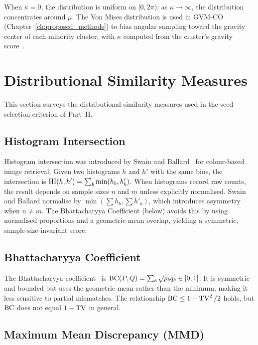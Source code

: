 When $\kappa = 0$, the distribution is uniform on $[0, 2\pi)$; as $\kappa \to \infty$, the distribution concentrates around $\mu$.
The Von Mises distribution is used in GVM-CO (Chapter~\ref{ch:proposed_methods}) to bias angular sampling toward the gravity center of each minority cluster, with $\kappa$ computed from the cluster's gravity score~\cite{mardia2000directional}.

\section{Distributional Similarity Measures}
\label{sec:bg:distrib_similarity}

This section surveys the distributional similarity measures used in the seed selection criterion of Part~II.

\subsection{Histogram Intersection}
\label{sec:bg:histogram_intersection}

Histogram intersection was introduced by Swain and Ballard~\cite{swain1991color} for colour-based image retrieval.
Given two histograms $h$ and $h'$ with the same bins, the intersection is $\operatorname{HI}(h,h') = \sum_b \min(h_b, h'_b)$.
When histograms record raw counts, the result depends on sample sizes $n$ and $m$ unless explicitly normalised.
Swain and Ballard normalise by $\min(\sum h_b, \sum h'_b)$, which introduces asymmetry when $n \neq m$.
The Bhattacharyya Coefficient (below) avoids this by using normalised proportions and a geometric-mean overlap, yielding a symmetric, sample-size-invariant score.

\subsection{Bhattacharyya Coefficient}

The Bhattacharyya coefficient~\cite{bhattacharyya1943measure} is $\operatorname{BC}(P,Q) = \sum_b \sqrt{p_b q_b} \in [0,1]$.
It is symmetric and bounded but uses the geometric mean rather than the minimum, making it less sensitive to partial mismatches.
The relationship $\operatorname{BC} \leq 1 - \operatorname{TV}^2/2$ holds, but $\operatorname{BC}$ does not equal $1 - \operatorname{TV}$ in general.

\subsection{Maximum Mean Discrepancy (MMD)}

